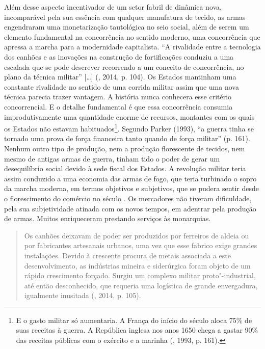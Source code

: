 Além desse aspecto incentivador de um setor fabril de dinâmica nova,
incomparável pela sua essência com qualquer manufatura de tecido, as
armas engendraram uma monetarização tautológica no seio social, além de
serem um elemento fundamental na concorrência no sentido moderno, uma
concorrência que apressa a marcha para a modernidade capitalista. ``A
rivalidade entre a tecnologia dos canhões e as inovações na construção
de fortificações conduziu a uma escalada que se pode descrever
recorrendo a um conceito de concorrência, no plano da técnica militar''
[\ldots{}] (, 2014, p. 104). Os Estados mantinham uma constante
rivalidade no sentido de uma corrida militar assim que uma nova técnica
parecia trazer vantagem. A história nunca conhecera esse critério
concorrencial. E o detalhe fundamental é que essa concorrência consumia
improdutivamente uma quantidade enorme de recursos, montantes com os
quais os Estados não estavam habituados\footnote{E o gasto militar só
  aumentaria. A França do início do século  aloca 75\% de suas
  receitas à guerra. A República inglesa nos anos 1650 chega a gastar
  90\% das receitas públicas com o exército e a marinha (, 1993,
  p. 161).}. Segundo Parker (1993), ``a guerra tinha se tornado uma prova
de força financeira tanto quando de força militar'' (p. 161). Nenhum
outro tipo de produção, nem a produção florescente de tecidos, nem mesmo
de antigas armas de guerra, tinham tido o poder de gerar um
desequilíbrio social devido à sede fiscal dos Estados. A revolução
militar teria assim conduzido a uma economia das armas de fogo, que
teria turbinado o sopro da marcha moderna, em termos objetivos e
subjetivos, que se pudera sentir desde o florescimento do comércio no
século . Os mercadores não tiveram dificuldade, pela sua subjetividade
atinada com os novos tempos, em adentrar pela produção de armas. Muitos
enriqueceram prestando serviços às monarquias.

\begin{quote}
Os canhões deixavam de poder ser produzidos por ferreiros de aldeia ou
por fabricantes artesanais urbanos, uma vez que esse fabrico exige
grandes instalações. Devido à crescente procura de metais associada a
este desenvolvimento, as indústrias mineira e siderúrgica foram objeto
de um rápido crescimento forçado. Surgiu um complexo militar
proto"-industrial, até então desconhecido, que requeria uma logística de
grande envergadura, igualmente inusitada (, 2014, p. 105).
\end{quote}

